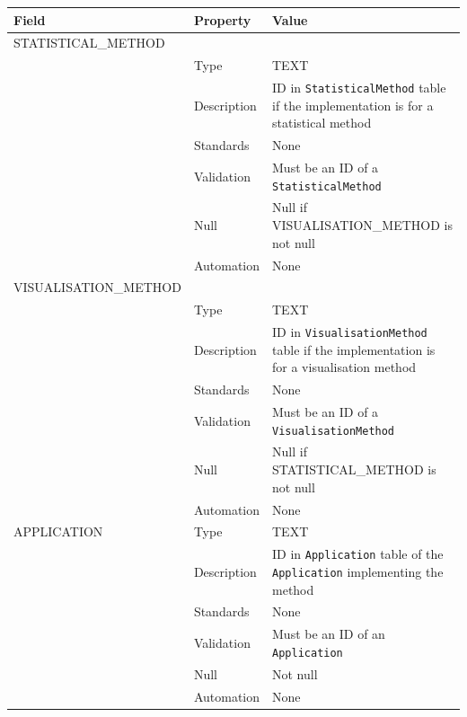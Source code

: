 \documentclass[
]{article}
\newcounter{none} %
\begin{document}
{\def\LTcaptype{none} %
\begin{longtable}[]{@{}
  >{\raggedright\arraybackslash}p{}
  >{\raggedright\arraybackslash}p{}
  >{\raggedright\arraybackslash}p{}@{}}
\toprule\noalign{}
\begin{minipage}[b]{\linewidth}\raggedright
Field
\end{minipage} & \begin{minipage}[b]{\linewidth}\raggedright
Property
\end{minipage} & \begin{minipage}[b]{\linewidth}\raggedright
Value
\end{minipage} \\
\midrule\noalign{}
\endhead
\bottomrule\noalign{}
\endlastfoot
STATISTICAL\_METHOD & & \\
& Type & TEXT \\
& Description & ID in \texttt{StatisticalMethod} table if the
implementation is for a statistical method \\
& Standards & None \\
& Validation & Must be an ID of a \texttt{StatisticalMethod} \\
& Null & Null if VISUALISATION\_METHOD is not null \\
& Automation & None \\
VISUALISATION\_METHOD & & \\
& Type & TEXT \\
& Description & ID in \texttt{VisualisationMethod} table if the
implementation is for a visualisation method \\
& Standards & None \\
& Validation & Must be an ID of a \texttt{VisualisationMethod} \\
& Null & Null if STATISTICAL\_METHOD is not null \\
& Automation & None \\
APPLICATION & Type & TEXT \\
& Description & ID in \texttt{Application} table of the
\texttt{Application} implementing the method \\
& Standards & None \\
& Validation & Must be an ID of an \texttt{Application} \\
& Null & Not null \\
& Automation & None \\
\end{longtable}
}
\end{document}
